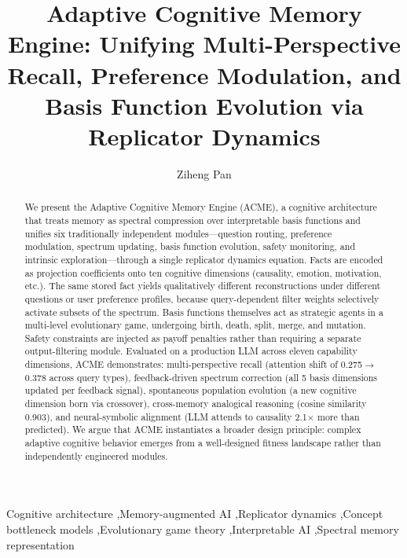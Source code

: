 \documentclass[review]{elsarticle}
\begin{document}
\begin{frontmatter}

\title{Adaptive Cognitive Memory Engine: Unifying Multi-Perspective Recall,
Preference Modulation, and Basis Function Evolution via Replicator Dynamics}

\author[1]{Ziheng Pan}

\address[1]{Independent Researcher}


\begin{abstract}
We present the Adaptive Cognitive Memory Engine (ACME), a cognitive architecture
that treats memory as spectral compression over interpretable basis functions and
unifies six traditionally independent modules---question routing, preference
modulation, spectrum updating, basis function evolution, safety monitoring, and
intrinsic exploration---through a single replicator dynamics equation.
Facts are encoded as projection coefficients onto ten cognitive dimensions
(causality, emotion, motivation, etc.). The same stored fact yields
qualitatively different reconstructions under different questions or user
preference profiles, because query-dependent filter weights selectively
activate subsets of the spectrum. Basis functions themselves act as strategic
agents in a multi-level evolutionary game, undergoing birth, death, split,
merge, and mutation. Safety constraints are injected as payoff penalties rather
than requiring a separate output-filtering module. Evaluated on a production LLM
across eleven capability dimensions, ACME demonstrates: multi-perspective recall
(attention shift of 0.275$\to$0.378 across query types), feedback-driven spectrum
correction (all 5 basis dimensions updated per feedback signal), spontaneous
population evolution (a new cognitive dimension born via crossover), cross-memory
analogical reasoning (cosine similarity 0.903), and neural-symbolic alignment
(LLM attends to causality 2.1$\times$ more than predicted). We argue that ACME
instantiates a broader design principle: complex adaptive cognitive behavior
emerges from a well-designed fitness landscape rather than independently
engineered modules.
\end{abstract}

\begin{keyword}
Cognitive architecture \sep Memory-augmented AI \sep Replicator dynamics
\sep Concept bottleneck models \sep Evolutionary game theory
\sep Interpretable AI \sep Spectral memory representation
\end{keyword}

\end{frontmatter}
\end{document}
